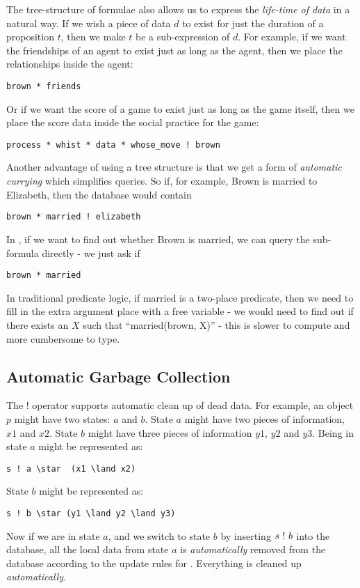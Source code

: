 The tree-structure of formulae also allows us to express the \emph{life-time of data} in a natural way. 
If we wish a piece of data $d$ to exist for just the duration of a proposition $t$, then we make $t$ be a sub-expression of $d$. 
For example, if we want the friendships of an agent to exist just as long as the agent, then we place the relationships inside the agent: 
\begin{verbatim}
brown * friends
\end{verbatim}
Or if we want the score of a game to exist just as long as the game itself, then we place the score data inside the social practice for the game: 
\begin{verbatim}
process * whist * data * whose_move ! brown
\end{verbatim}

Another advantage of using a tree structure is that we get a form of \emph{automatic currying} which simplifies queries.
So if, for example, Brown is married to Elizabeth, then the database would contain 
\begin{verbatim}
brown * married ! elizabeth
\end{verbatim}
In \ELFULL{}, if we want to find out whether Brown is married, we can query the sub-formula directly -  we just ask if 
\begin{verbatim}
brown * married
\end{verbatim}
In traditional predicate logic, if married is a two-place predicate, then we need to fill in the extra argument place with a free variable - we would need to find out if there exists an $X$ such that ``married(brown, X)'' - this is slower to compute and more cumbersome to type. 

\subsection{Automatic Garbage Collection}
The $!$ operator supports automatic clean up of dead data.
For example, an object $p$ might have two states: $a$ and $b$. State $a$ might have two pieces of information, $x1$ and $x2$. State $b$ might have three pieces of information $y1$, $y2$ and $y3$. Being in state $a$ might be represented as:
\begin{verbatim}
s ! a \star  (x1 \land x2)
\end{verbatim}
State $b$ might be represented as:
\begin{verbatim}
s ! b \star (y1 \land y2 \land y3)
\end{verbatim}
Now if we are in state $a$, and we switch to state $b$ by inserting $s \ ! \  b$ into the database, all the local data from  state $a$ is \emph{automatically} removed from the database according to the update rules for \ELFULL{}. Everything is cleaned up \emph{automatically}.


